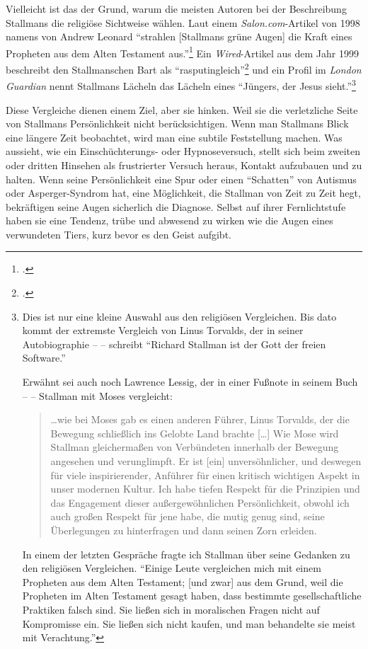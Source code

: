 Vielleicht ist das der Grund, warum die meisten Autoren bei der Beschreibung Stallmans die religiöse Sichtweise wählen. Laut einem \textit{Salon.com}-Artikel von 1998 namens  von Andrew Leonard "`strahlen [Stallmans grüne Augen] die Kraft eines Propheten aus dem Alten Testament aus."'\footcite[Vgl.][]{saint} Ein \textit{Wired}-Artikel aus dem Jahr 1999 beschreibt den Stallmanschen Bart als "`rasputingleich"'\footcite[Vgl.][]{forgotten} und ein Profil im \textit{London Guardian} nennt Stallmans Lächeln das Lächeln eines "`Jüngers, der Jesus sieht."'\footnote{\cite[Vgl.][]{moralhigh}

Dies ist nur eine kleine Auswahl aus den religiösen Vergleichen. Bis dato kommt der extremste Vergleich von Linus Torvalds, der in seiner Autobiographie –  – schreibt "`Richard Stallman ist der Gott der freien Software."'

Erwähnt sei auch noch Lawrence Lessig, der in einer Fußnote in seinem Buch –  – Stallman mit Moses vergleicht:

\begin{quote}
\ldots wie bei Moses gab es einen anderen Führer, Linus Torvalds, der die Bewegung schließlich ins Gelobte Land brachte [\ldots] Wie Mose wird Stallman gleichermaßen von Verbündeten innerhalb der Bewegung angesehen und verunglimpft. Er ist [ein] unversöhnlicher, und deswegen für viele inspirierender, Anführer für einen kritisch wichtigen Aspekt in unser modernen Kultur. Ich habe tiefen Respekt für die Prinzipien und das Engagement dieser außergewöhnlichen Persönlichkeit, obwohl ich auch großen Respekt für jene habe, die mutig genug sind, seine Überlegungen zu hinterfragen und dann seinen Zorn erleiden.
\end{quote}

In einem der letzten Gespräche fragte ich Stallman über seine Gedanken zu den religiösen Vergleichen. "`Einige Leute vergleichen mich mit einem Propheten aus dem Alten Testament; [und zwar] aus dem Grund, weil die Propheten im Alten Testament gesagt haben, dass bestimmte gesellschaftliche Praktiken falsch sind. Sie ließen sich in moralischen Fragen nicht auf Kompromisse ein. Sie ließen sich nicht kaufen, und man behandelte sie meist mit Verachtung."'}

Diese Vergleiche dienen einem Ziel, aber sie hinken. Weil sie die verletzliche Seite von Stallmans Persönlichkeit nicht berücksichtigen. Wenn man Stallmans Blick eine längere Zeit beobachtet, wird man eine subtile Feststellung machen. Was aussieht, wie ein Einschüchterungs- oder Hypnoseversuch, stellt sich beim zweiten oder dritten Hinsehen als frustrierter Versuch heraus, Kontakt aufzubauen und zu halten. Wenn seine Persönlichkeit eine Spur oder einen "`Schatten"' von Autismus oder Asperger-Syndrom hat, eine Möglichkeit, die Stallman von Zeit zu Zeit hegt, bekräftigen seine Augen sicherlich die Diagnose. Selbst auf ihrer Fernlichtstufe haben sie eine Tendenz, trübe und abwesend zu wirken wie die Augen eines verwundeten Tiers, kurz bevor es den Geist aufgibt.

